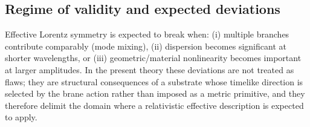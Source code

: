 \subsection{Regime of validity and expected deviations}

Effective Lorentz symmetry is expected to break when:
(i) multiple branches contribute comparably (mode mixing),
(ii) dispersion becomes significant at shorter wavelengths, or
(iii) geometric/material nonlinearity becomes important at larger amplitudes.
In the present theory these deviations are not treated as flaws; they are structural consequences of a substrate whose timelike direction is selected by the brane action rather than imposed as a metric primitive, and they therefore delimit the domain where a relativistic effective description is expected to apply.
